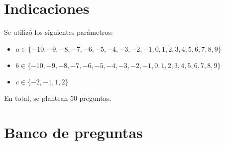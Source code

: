\documentclass[a4,11pt]{aleph-notas}
\begin{document}
\encabezado

\section{Indicaciones}



Se utilizó los siguientes parámetros:
\begin{itemize}
	\item $a \in \{-10, -9, -8, -7, -6, -5, -4, -3, -2, -1, 0, 1, 2, 3, 4, 5, 6, 7, 8, 9\}$
	\item $b \in \{-10, -9, -8, -7, -6, -5, -4, -3, -2, -1, 0, 1, 2, 3, 4, 5, 6, 7, 8, 9\}$
	\item $c \in \{-2, -1, 1, 2\}$

\end{itemize}
En total, se plantean 50 preguntas.


\section{Banco de preguntas}
\end{document}
